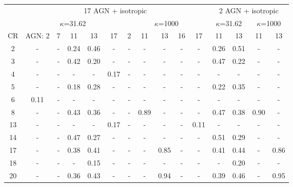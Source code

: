 
\begin{sidewaystable}
\begin{center}
\begin{tabular}{|c|c|c|c|c|c|c|c|c|c|c|c|c|c|c|}

  \hline
  & \multicolumn{10}{|c|}{17 AGN + isotropic} & \multicolumn{4}{|c|}{2 AGN + isotropic} \\
  \cline{2-15}
  & \multicolumn{5}{|c|}{$\kappa$=31.62} & \multicolumn{5}{|c|}{$\kappa$=1000}& \multicolumn{2}{|c|}{$\kappa$=31.62} & \multicolumn{2}{|c|}{$\kappa$=1000} \\
   \cline{2-15}
  CR &
        AGN: 2  &   7  &  11  &  13  &  17  &   2   &   11   &   13   &   16  &   17  &   11  &   13  &   11   &   13  \\
  \hline
  2 &   -  &   -  & 0.24 & 0.46 &   -  &   -   &   -    &    -   &   -    &   -    & 0.26  & 0.51  &   -    &   -   \\
  3 &   -  &   -  & 0.42 & 0.20 &   -  &   -   &   -    &    -   &   -    &   -    & 0.47  & 0.22  &   -    &   -   \\
  4 &   -  &   -  &   -  &    - & 0.17 &   -   &   -    &    -   &   -    &   -    &   -   &    -  &   -    &   -   \\
  5 &   -  &   -  & 0.18 & 0.28 &   -  &   -   &   -    &    -   &   -    &   -    & 0.22  & 0.35  &   -    &   -   \\
  6 & 0.11 &   -  &   -  &   -  &   -  &   -   &   -    &    -   &   -    &   -    &   -   &   -   &   -    &   -   \\
  8 &   -  &   -  & 0.43 & 0.36 &   -  &   -   & 0.89   &    -   &   -    &   -    & 0.47  & 0.38  & 0.90   &   -   \\
 13 &   -  &   -  &   -  &   -  & 0.17 &   -   &   -    &   -    &   -    & 0.11   &   -   &   -   &   -    &   -   \\
 14 &   -  &   -  & 0.47 & 0.27 &   -  &   -   &   -    &   -    &   -    &   -    & 0.51  & 0.29  &   -    &   -   \\
 \hline
 17 &   -  &   -  & 0.38 & 0.41 &   -  &   -   &   -    & 0.85   &   -    &   -    & 0.41  & 0.44  &   -    & 0.86  \\
 18 &   -  &   -  &   -  & 0.15 &   -  &   -   &   -    &   -    &   -    &   -    &   -   & 0.20  &   -    &   -   \\
 20 &   -  &   -  & 0.36 & 0.43 &   -  &   -   &   -    & 0.94   &   -    &   -    & 0.39  & 0.46  &   -    & 0.95  \\

\end{tabular}
\end{center}
\end{sidewaystable}

